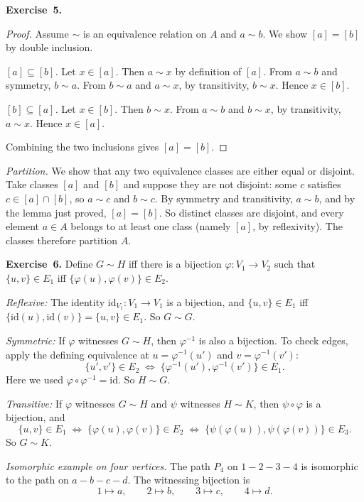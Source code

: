 \documentclass[11pt]{article}
\begin{document}
\medskip
\textbf{Exercise~5.}
\begin{proof}
Assume $\sim$ is an equivalence relation on $A$ and $a \sim b$.  We show
$[a] = [b]$ by double inclusion.

\emph{$[a] \subseteq [b]$.}  Let $x \in [a]$.  Then $a \sim x$ by
definition of $[a]$.  From $a \sim b$ and symmetry, $b \sim a$.  From
$b \sim a$ and $a \sim x$, by transitivity, $b \sim x$.  Hence
$x \in [b]$.

\emph{$[b] \subseteq [a]$.}  Let $x \in [b]$.  Then $b \sim x$.  From
$a \sim b$ and $b \sim x$, by transitivity, $a \sim x$.  Hence $x \in [a]$.

Combining the two inclusions gives $[a] = [b]$.
\end{proof}

\emph{Partition.}  We show that any two equivalence classes are either
equal or disjoint.  Take classes $[a]$ and $[b]$ and suppose they are
not disjoint: some $c$ satisfies $c \in [a] \cap [b]$, so $a \sim c$
and $b \sim c$.  By symmetry and transitivity, $a \sim b$, and by the
lemma just proved, $[a] = [b]$.  So distinct classes are disjoint, and
every element $a \in A$ belongs to at least one class (namely $[a]$, by
reflexivity).  The classes therefore partition $A$.

\medskip
\textbf{Exercise~6.}
Define $G \sim H$ iff there is a bijection $\varphi : V_1 \to V_2$
such that $\{u, v\} \in E_1$ iff $\{\varphi(u), \varphi(v)\} \in E_2$.

\emph{Reflexive:} The identity $\mathrm{id}_{V_1} : V_1 \to V_1$ is a
bijection, and $\{u, v\} \in E_1$ iff $\{\mathrm{id}(u), \mathrm{id}(v)\} =
\{u, v\} \in E_1$.  So $G \sim G$.  \checkmark

\emph{Symmetric:} If $\varphi$ witnesses $G \sim H$, then $\varphi^{-1}$
is also a bijection. To check edges, apply the defining equivalence at
$u = \varphi^{-1}(u')$ and $v = \varphi^{-1}(v')$:
\[
  \{u', v'\} \in E_2
    \;\iff\;
  \{\varphi^{-1}(u'), \varphi^{-1}(v')\} \in E_1.
\]
Here we used $\varphi \circ \varphi^{-1} = \mathrm{id}$.
So $H \sim G$.  \checkmark

\emph{Transitive:} If $\varphi$ witnesses $G \sim H$ and $\psi$
witnesses $H \sim K$, then $\psi \circ \varphi$ is a bijection, and
\[
  \{u, v\} \in E_1
    \;\iff\; \{\varphi(u), \varphi(v)\} \in E_2
    \;\iff\; \{\psi(\varphi(u)), \psi(\varphi(v))\} \in E_3.
\]
So $G \sim K$.  \checkmark

\emph{Isomorphic example on four vertices.}  The path $P_4$ on
$1 - 2 - 3 - 4$ is isomorphic to the path on $a - b - c - d$.  The
witnessing bijection is
\[
  1 \mapsto a,\qquad 2 \mapsto b,\qquad
  3 \mapsto c,\qquad 4 \mapsto d.
\]
\end{document}
